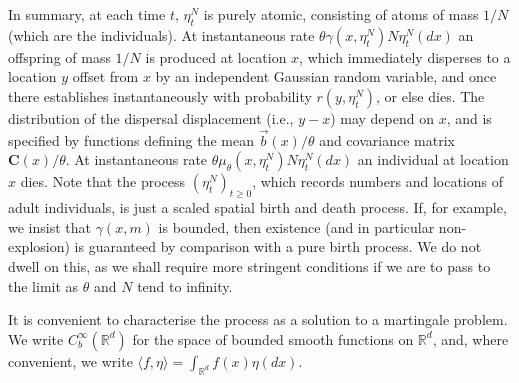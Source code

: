 \documentclass[EJP]{ejpecp} %
\newcommand{\IR}{\mathbb R}
\newcommand{\meanq}{\vec b}    %
\newcommand{\covq}{\mathbf{C}}     %
\begin{document}
In summary, at each time $t$, $\eta^N_t$ is purely atomic, consisting of atoms of mass $1/N$
(which are the individuals).
At instantaneous rate $\theta \gamma(x, \eta^N_t) N \eta^N_t(dx)$ an offspring of mass $1/N$ is 
produced at location $x$, which
immediately disperses to a location $y$ offset from $x$
by an independent Gaussian random variable,
and once there establishes instantaneously 
with probability $r(y, \eta^N_t)$, or else dies. 
The distribution of the dispersal displacement (i.e., $y-x$) may depend on $x$,
and is specified by functions defining the mean $\meanq(x) / \theta$ 
and covariance matrix $\covq(x) / \theta$.
At instantaneous rate $\theta \mu_\theta(x, \eta^N_t) N \eta^N_t(dx)$ an individual at location 
$x$ dies.
Note that the process 
$\left(\eta^N_t\right)_{t\ge 0}$, which
records numbers and locations of adult individuals, is just a scaled spatial birth and 
death process. If, for example, we insist that $\gamma(x,m)$ is bounded, then 
existence (and in particular non-explosion) is guaranteed by comparison with
a pure birth process. We do not dwell on this, as we shall require more stringent conditions
if we are to pass to the limit as $\theta$ and $N$ tend to infinity.

It is convenient to characterise the process as a solution to a martingale problem.
We write $C_b^\infty(\IR^d)$ for the space of bounded smooth functions on $\IR^d$, and, where
convenient, we
write $\langle f, \eta \rangle = \int_{\IR^d} f(x) \eta(dx)$.
\end{document}
